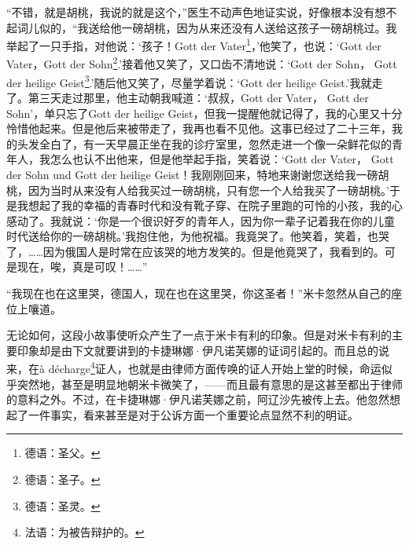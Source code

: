 \par “不错，就是胡桃，我说的就是这个，”医生不动声色地证实说，好像根本没有想不起词儿似的，“我送给他一磅胡桃，因为从来还没有人送给这孩子一磅胡桃过。我举起了一只手指，对他说：‘孩子！Gott der Vater\footnote{德语：圣父。}，’他笑了，也说：‘Gott der Vater，Gott der Sohn\footnote{德语：圣子。}.’接着他又笑了，又口齿不清地说：‘Gott der Sohn， Gott der heilige Geist\footnote{德语：圣灵。}.’随后他又笑了，尽量学着说：‘Gott der heilige Geist.’我就走了。第三天走过那里，他主动朝我喊道：‘叔叔，Gott der Vater， Gott der Sohn’，单只忘了Gott der heilige Geist，但我一提醒他就记得了，我的心里又十分怜惜他起来。但是他后来被带走了，我再也看不见他。这事已经过了二十三年，我的头发全白了，有一天早晨正坐在我的诊疗室里，忽然走进一个像一朵鲜花似的青年人，我怎么也认不出他来，但是他举起手指，笑着说：‘Gott der Vater， Gott der Sohn und Gott der heilige Geist！我刚刚回来，特地来谢谢您送给我一磅胡桃，因为当时从来没有人给我买过一磅胡桃，只有您一个人给我买了一磅胡桃。’于是我想起了我的幸福的青春时代和没有靴子穿、在院子里跑的可怜的小孩，我的心感动了。我就说：‘你是一个很识好歹的青年人，因为你一辈子记着我在你的儿童时代送给你的一磅胡桃。’我抱住他，为他祝福。我竟哭了。他笑着，笑着，也哭了，……因为俄国人是时常在应该哭的地方发笑的。但是他竟哭了，我看到的。可是现在，唉，真是可叹！……”
\par “我现在也在这里哭，德国人，现在也在这里哭，你这圣者！”米卡忽然从自己的座位上嚷道。
\par 无论如何，这段小故事使听众产生了一点于米卡有利的印象。但是对米卡有利的主要印象却是由下文就要讲到的卡捷琳娜·伊凡诺芙娜的证词引起的。而且总的说来，在à décharge\footnote{法语：为被告辩护的。}证人，也就是由律师方面传唤的证人开始上堂的时候，命运似乎突然地，甚至是明显地朝米卡微笑了，——而且最有意思的是这甚至都出于律师的意料之外。不过，在卡捷琳娜·伊凡诺芙娜之前，阿辽沙先被传上去。他忽然想起了一件事实，看来甚至是对于公诉方面一个重要论点显然不利的明证。
